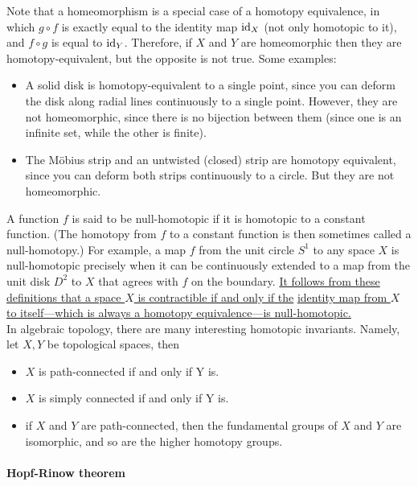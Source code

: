 \documentclass{homework}
\begin{document}
Note that a homeomorphism is a special case of a homotopy equivalence, in which $g \circ f$ is exactly equal to the identity map $\textnormal{id}_X$ (not only homotopic to it), and $f \circ g$ is equal to $\textnormal{id}_Y$. Therefore, if $X$ and $Y$ are homeomorphic then they are homotopy-equivalent, but the opposite is not true. Some examples:

\begin{itemize}
    \item A solid disk is homotopy-equivalent to a single point, since you can deform the disk along radial lines continuously to a single point. However, they are not homeomorphic, since there is no bijection between them (since one is an infinite set, while the other is finite).
    \item The Möbius strip and an untwisted (closed) strip are homotopy equivalent, since you can deform both strips continuously to a circle. But they are not homeomorphic. \\
\end{itemize}

A function $f$ is said to be null-homotopic if it is homotopic to a constant function. (The homotopy from $f$ to a constant function is then sometimes called a null-homotopy.) For example, a map $f$ from the unit circle $S^1$ to any space $X$ is null-homotopic precisely when it can be continuously extended to a map from the unit disk $D^2$ to $X$ that agrees with $f$ on the boundary. \underline{It follows from these definitions that a space $X$ is contractible if and only if the}
\underline{ identity map from $X$ to itself—which is always a homotopy equivalence—is null-homotopic.} \\

In algebraic topology, there are many interesting homotopic invariants. Namely, let $X, Y$ be topological spaces, then 

\begin{itemize}
    \item $X$ is path-connected if and only if Y is.
    \item $X$ is simply connected if and only if Y is.
    \item if $X$ and $Y$ are path-connected, then the fundamental groups of $X$ and $Y$ are isomorphic, and so are the higher homotopy groups. \\
\end{itemize}

\paragraph{\textbf{Hopf-Rinow theorem}}
\end{document}

